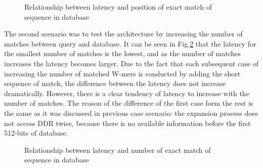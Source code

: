 \begin{figure}
\caption{Relationship between latency and position of exact match of sequence in database} \label{fig:plot1}
\end{figure}

The second scenario was to test the architecture by increasing the number of matches between query and database. It can be seen in Fig.\ref{fig:plot2} that the latency for the smallest number of matches is the lowest, and as the number of matches increases the latency becomes larger. Due to the fact that each subsequent case of increasing the number of matched W-mers is conducted by adding the short sequence of match, the difference between the latency does not increase dramatically. However, there is a clear tendency of latency to increase with the number of matches. The reason of the difference of the first case form the rest is the same as it was discussed in previous case scenario: the expansion process does not access DDR twice, because there is no available information before the first 512-bits of database. 


\begin{figure}
\caption{Relationship between latency and number of exact match of sequence in database} \label{fig:plot2}
\end{figure}